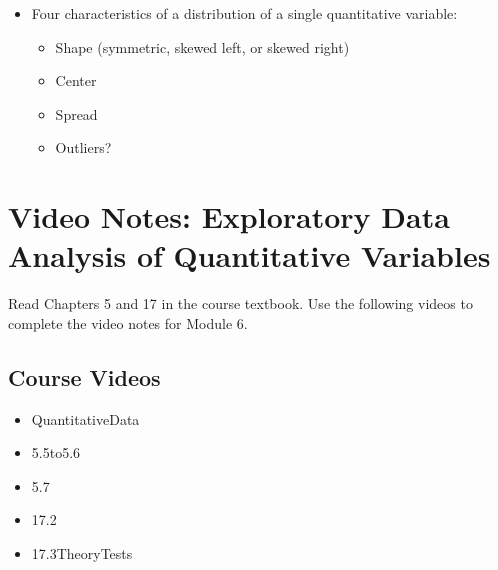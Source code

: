\documentclass[
]{report}
\newenvironment{Shaded}{\begin{snugshade}}{\end{snugshade}}
\newcommand{\AttributeTok}[1]{\textcolor[rgb]{0.13,0.29,0.53}{#1}}
\newcommand{\CommentTok}[1]{\textcolor[rgb]{0.56,0.35,0.01}{\textit{#1}}}
\newcommand{\FunctionTok}[1]{\textcolor[rgb]{0.13,0.29,0.53}{\textbf{#1}}}
\newcommand{\NormalTok}[1]{#1}
\newcommand{\SpecialCharTok}[1]{\textcolor[rgb]{0.81,0.36,0.00}{\textbf{#1}}}
\newcommand{\StringTok}[1]{\textcolor[rgb]{0.31,0.60,0.02}{#1}}
\begin{document}
\begin{itemize}
\begin{Shaded}
\begin{Highlighting}[]
\NormalTok{object }\SpecialCharTok{\%\textgreater{}\%} \CommentTok{\# Data set piped into...}
    \FunctionTok{ggplot}\NormalTok{(}\FunctionTok{aes}\NormalTok{(}\AttributeTok{x =}\NormalTok{ variable)) }\SpecialCharTok{+} \CommentTok{\# Name variable to plot}
    \FunctionTok{geom\_dotplot}\NormalTok{() }\SpecialCharTok{+} \CommentTok{\# Create dotplot }
    \FunctionTok{labs}\NormalTok{(}\AttributeTok{title =} \StringTok{"Don\textquotesingle{}t forget to title the plot!"}\NormalTok{, }\CommentTok{\# Title for plot}
        \AttributeTok{x =} \StringTok{"x{-}axis label"}\NormalTok{, }\CommentTok{\# Label for x axis}
        \AttributeTok{y =} \StringTok{"y{-}axis label"}\NormalTok{) }\CommentTok{\# Label for y axis}
\end{Highlighting}
\end{Shaded}
\item
  Four characteristics of a distribution of a single quantitative variable:

  \begin{itemize}
  \item
    Shape (symmetric, skewed left, or skewed right)
  \item
    Center
  \item
    Spread
  \item
    Outliers?
  \end{itemize}
\end{itemize}

\newpage

\section{Video Notes: Exploratory Data Analysis of Quantitative Variables}\label{video-notes-exploratory-data-analysis-of-quantitative-variables}

Read Chapters 5 and 17 in the course textbook. Use the following videos to complete the video notes for Module 6.

\subsection{Course Videos}\label{course-videos}

\begin{itemize}
\item
  QuantitativeData
\item
  5.5to5.6
\item
  5.7
\item
  17.2
\item
  17.3TheoryTests
\end{itemize}
\end{document}

